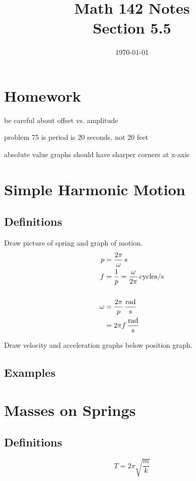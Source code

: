 \documentclass{exam}
\title{Math 142 Notes \\ Section 5.5}
\date{\today}
\begin{document}
  \maketitle
  \tableofcontents

  \pagebreak

  \section{Homework}
  \begin{itemize*}
    \item be careful about offset vs. amplitude
    \item problem 75 is period is 20 seconds, not 20 feet
    \item absolute value graphs should have sharper corners at x-axis
  \end{itemize*}

  \section{Simple Harmonic Motion}

  \subsection{Definitions}
    Draw picture of spring and graph of motion.
    \begin{align*}
      p      & = \unit[ \frac{2 \pi}{\omega} ]{s} \\
      f      & = \frac{1}{p} = \unit[ \frac{\omega}{2 \pi} ]{cycles/s} \\
      \\
      \omega & = \unit[ \frac{2 \pi}{p} ]{\frac{rad}{s}} \\
             & = \unit[ 2 \pi f ]{\frac{rad}{s}} \\
    \end{align*}

    Draw velocity and acceleration graphs below position graph.

  \subsection{Examples}

  \section{Masses on Springs}
  \subsection{Definitions}
  \[
    T = 2 \pi \sqrt{\frac{m}{k}}
  \]
          
\end{document}
